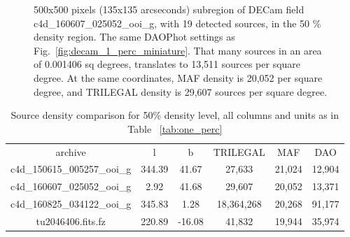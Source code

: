 \documentclass[DM,lsstdraft,toc,usenatbib]{lsstdoc}
\begin{document}
\begin{figure}
\begin{minipage}[t]{0.5\linewidth}
\caption{500x500 pixels (135x135 arcseconds) subregion of DECam field c4d\_160607\_025052\_ooi\_g,  with 19  detected sources, in the  50 \% density region. The same DAOPhot settings as Fig.~\ref{fig:decam_1_perc_miniature}. That many sources in an area of 0.001406 sq degrees,  translates to 13,511 sources per square degree. At the same coordinates, MAF density is  20,052 per square degree, and TRILEGAL density is 29,607 sources per square degree.}
\label{fig:decam_20_perc_miniature}
\end{minipage}%
\end{figure}


\begin{table}
\begin{tabular}{cccccc}
archive & l & b & TRILEGAL & MAF & DAO \\
c4d\_150615\_005257\_ooi\_g & 344.39 & 41.67 & 27,633 & 21,024 & 12,904 \\
c4d\_160607\_025052\_ooi\_g & 2.92 & 41.68 & 29,607 & 20,052 & 13,371 \\
c4d\_160825\_034122\_ooi\_g & 345.83 & 1.28 & 18,364,268 & 20,268 & 91,177 \\
tu2046406.fits.fz & 220.89 & -16.08 & 41,832 & 19,944 & 35,974 \\
\end{tabular}
\caption{Source density comparison for 50\% density level, all columns and units as in Table ~\ref{tab:one_perc}}
\label{tab:fifty_perc}
\end{table}





\end{document}

